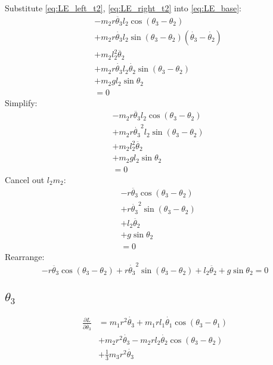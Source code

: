 \documentclass[titlepage]{article}
\numberwithin{equation}{section}
\begin{document}
\bigskip
\noindent
Substitute \ref{eq:LE_left_t2}, \ref{eq:LE_right_t2} into \ref{eq:LE_base}:
\begin{align}
 &- m_2 r \ddot{\theta_3} l_2 \cos{(\theta_3 - \theta_2)} \nonumber \\
 &+ m_2 r \dot{\theta_3} l_2 \sin{(\theta_3 - \theta_2)} (\dot{\theta_3} - \dot{\theta_2}) \nonumber \\
 &+ m_2 l_2^2 \ddot{\theta_2} \nonumber \\
 &+ m_2 r \dot{\theta_3} l_2 \dot{\theta_2} \sin{(\theta_3 - \theta_2)} \nonumber \\
 &+ m_2 g l_2 \sin \theta_2 \nonumber \\
 &= 0
\end{align}
Simplify:
\begin{align}
 &- m_2 r \ddot{\theta_3} l_2 \cos{(\theta_3 - \theta_2)} \nonumber \\
 &+ m_2 r \dot{\theta_3}^2 l_2 \sin{(\theta_3 - \theta_2)} \nonumber \\
 &+ m_2 l_2^2 \ddot{\theta_2} \nonumber \\
 &+ m_2 g l_2 \sin \theta_2 \nonumber \\
 &= 0
\end{align}
Cancel out $l_2 m_2$:
\begin{align}
 &- r \ddot{\theta_3} \cos{(\theta_3 - \theta_2)} \nonumber \\
 &+ r \dot{\theta_3}^2 \sin{(\theta_3 - \theta_2)} \nonumber \\
 &+ l_2 \ddot{\theta_2} \nonumber \\
 &+ g \sin \theta_2 \nonumber \\
 &= 0
\end{align}
Rearrange:
\begin{equation}
 - r \ddot{\theta_3} \cos{(\theta_3 - \theta_2)} + r \dot{\theta_3}^2 \sin{(\theta_3 - \theta_2)} + l_2 \ddot{\theta_2} + g \sin \theta_2 = 0
\end{equation}

\subsection{$\theta_3$}
\begin{align}
\frac{\partial L}{\partial \dot{\theta_3}} &= m_1 r^2 \dot{\theta_3} + m_1 r l_1 \dot{\theta_1} \cos{(\theta_3 - \theta_1)} \nonumber \\
 &+ m_2 r^2 \dot{\theta_3} - m_2 r l_2 \dot{\theta_2} \cos{(\theta_3 - \theta_2)} \nonumber \\
 &+ \frac{1}{3} m_3 r^2 \dot{\theta_3}
\end{align}
\end{document}
